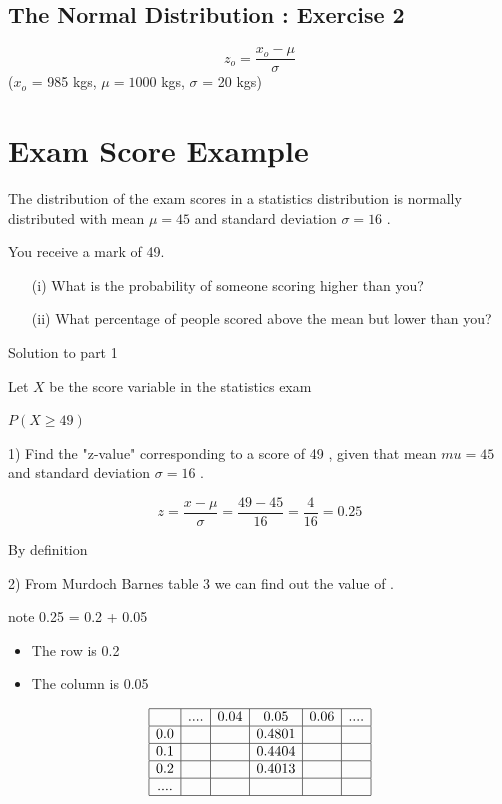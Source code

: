 \documentclass[]{report}
\begin{document}
\subsection{The Normal Distribution :  Exercise 2}

\[ z_o = \frac{x_o - \mu}{\sigma}  \]
($x_o$ = 985 kgs, $\mu = 1000$ kgs, $\sigma$ = 20 kgs)









\newpage
\section{Exam Score Example}
The distribution of the exam scores in a statistics distribution is normally distributed with mean $\mu=45$  and standard deviation 
$\sigma=16$
.

You receive a mark of 49.
\begin{itemize}
\item[(i)]
What is the probability of someone scoring higher than you?

\item[(ii)] What percentage of people scored above the mean but lower than you?
\end{itemize}
Solution to part 1

Let $X$ be the score variable in the statistics exam

$P(X \geq 49)$ 

1) Find the  "z-value" corresponding to a score of 49 , given that mean $mu=45$   and standard deviation  $\sigma=16$ .

\[ z  = \frac{x-\mu}{\sigma}   = \frac{49-45}{16}  = \frac{4}{16} =0.25\]

By definition  

2) From Murdoch Barnes table 3 we can find out the value of   . 

note  0.25 = 0.2 + 0.05

\begin{itemize}
\item    The row is 0.2
\item    The column is 0.05
\end{itemize}
\[
\begin{array}{|c|c|c|c|c|c|c|}\hline
& ....& 0.04& 0.05 & 0.06& .... \\ \hline
0.0&&& 0.4801 & & \\ \hline
0.1&&& 0.4404 && \\ \hline
0.2&&& 0.4013 && \\ \hline
....&&& & &\\ \hline

\end{array} \]
\end{document}
